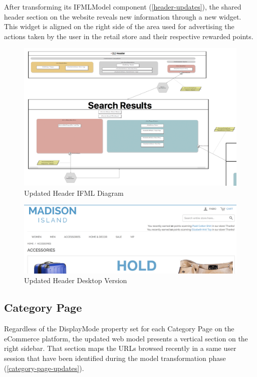 After transforming its IFMLModel component (\ref{header-updates}), the shared header section on the website reveals new information through a new widget. This widget is aligned on the right side of the area used for advertising the actions taken by the user in the retail store and their respective rewarded points.

\vspace{0.5cm}
\begin{figure}[H]
  \centering
    \includegraphics[width=14cm]{images/diagrams/after/ifml-header.png}
  \caption{Updated Header IFML Diagram}
  \label{fig:ifml-after-header}
\end{figure}

\begin{figure}[H]
  \centering
    \includegraphics[width=14cm]{images/diagrams/after/desktop-header.png}
  \caption{Updated Header Desktop Version}
  \label{fig:desktop-after-header}
\end{figure}
\vspace{0.5cm}

\newpage
\subsection{Category Page}

Regardless of the DisplayMode property set for each Category Page on the eCommerce platform, the updated web model presents a vertical section on the right sidebar. That section maps the URLs browsed recently in a same user session that have been identified during the model transformation phase (\ref{category-page-updates}).

